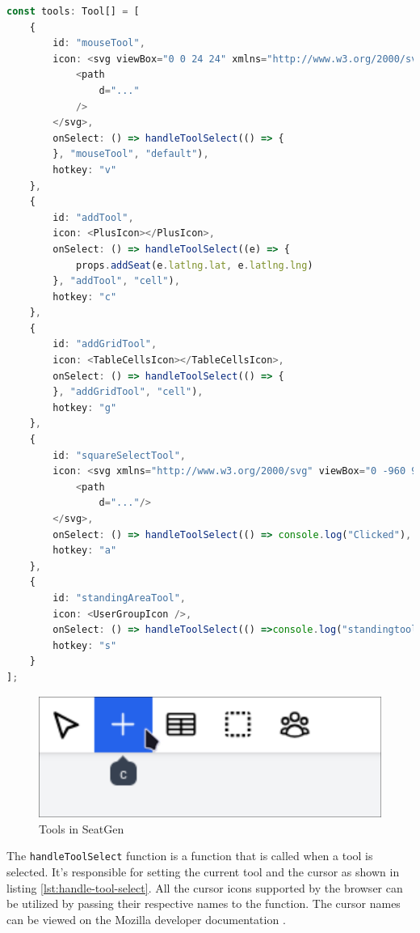\begin{lstlisting}[language=TypeScript,caption={Implemented Tools},label={lst:implemented-tools}]
const tools: Tool[] = [
    {
        id: "mouseTool",
        icon: <svg viewBox="0 0 24 24" xmlns="http://www.w3.org/2000/svg">
            <path
                d="..."
            />
        </svg>,
        onSelect: () => handleToolSelect(() => {
        }, "mouseTool", "default"),
        hotkey: "v"
    },
    {
        id: "addTool",
        icon: <PlusIcon></PlusIcon>,
        onSelect: () => handleToolSelect((e) => {
            props.addSeat(e.latlng.lat, e.latlng.lng)
        }, "addTool", "cell"),
        hotkey: "c"
    },
    {
        id: "addGridTool",
        icon: <TableCellsIcon></TableCellsIcon>,
        onSelect: () => handleToolSelect(() => {
        }, "addGridTool", "cell"),
        hotkey: "g"
    },
    {
        id: "squareSelectTool",
        icon: <svg xmlns="http://www.w3.org/2000/svg" viewBox="0 -960 960 960">
            <path
                d="..."/>
        </svg>,
        onSelect: () => handleToolSelect(() => console.log("Clicked"), "squareSelectTool", "crosshair"),
        hotkey: "a"
    },
    {
        id: "standingAreaTool",
        icon: <UserGroupIcon />,
        onSelect: () => handleToolSelect(() =>console.log("standingtool"), "standingAreaTool", "crosshair"),
        hotkey: "s"
    }
];
\end{lstlisting}

\begin{figure}
    \centering
    \includegraphics[scale=0.2]{pics/toolbar.png}
    \caption{Tools in SeatGen}
    \label{fig:tools}
\end{figure}


The \texttt{handleToolSelect} function is a function that is called when a tool is selected. It's responsible for setting the current tool and the cursor as shown in listing \ref{lst:handle-tool-select}. All the cursor icons supported by the browser can be utilized by passing their respective names to the function. The cursor names can be viewed on the Mozilla developer documentation \cite{MDNCursor}.

